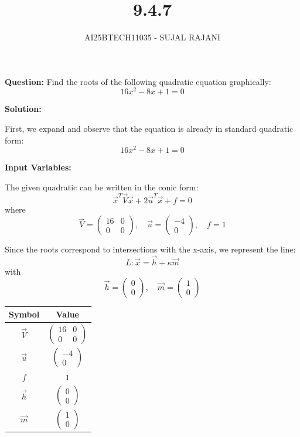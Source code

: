 \documentclass[journal,12pt,onecolumn]{IEEEtran}
\begin{document}
\title{9.4.7}
\author{AI25BTECH11035 - SUJAL RAJANI}
{\let\newpage\relax\maketitle}
\textbf{Question:} Find the roots of the following quadratic equation graphically:
\[
16x^2 - 8x + 1 = 0
\]

\textbf{Solution:}

First, we expand and observe that the equation is already in standard quadratic form:
\[
16x^2 - 8x + 1 = 0
\]

\textbf{Input Variables:}

The given quadratic can be written in the conic form:
\[
\vec{x}^T\vec{V}\vec{x} + 2\vec{u}^T\vec{x} + f = 0
\]
where
\[
\vec{V} = \begin{pmatrix} 16 & 0 \\ 0 & 0 \end{pmatrix}, \quad
\vec{u} = \begin{pmatrix} -4 \\ 0 \end{pmatrix}, \quad
f = 1
\]

Since the roots correspond to intersections with the x-axis, we represent the line:
\[
L : \vec{x} = \vec{h} + \kappa\vec{m}
\]
with
\[
\vec{h} = \begin{pmatrix} 0 \\ 0 \end{pmatrix}, \quad
\vec{m} = \begin{pmatrix} 1 \\ 0 \end{pmatrix}
\]

\begin{longtable}{|c|c|}
\hline
\textbf{Symbol} & \textbf{Value} \\
\hline
$\vec{V}$ & $\begin{pmatrix} 16 & 0 \\ 0 & 0 \end{pmatrix}$ \\
\hline
$\vec{u}$ & $\begin{pmatrix} -4 \\ 0 \end{pmatrix}$ \\
\hline
$f$ & $1$ \\
\hline
$\vec{h}$ & $\begin{pmatrix} 0 \\ 0 \end{pmatrix}$ \\
\hline
$\vec{m}$ & $\begin{pmatrix} 1 \\ 0 \end{pmatrix}$ \\
\hline
\end{longtable}
\end{document}
